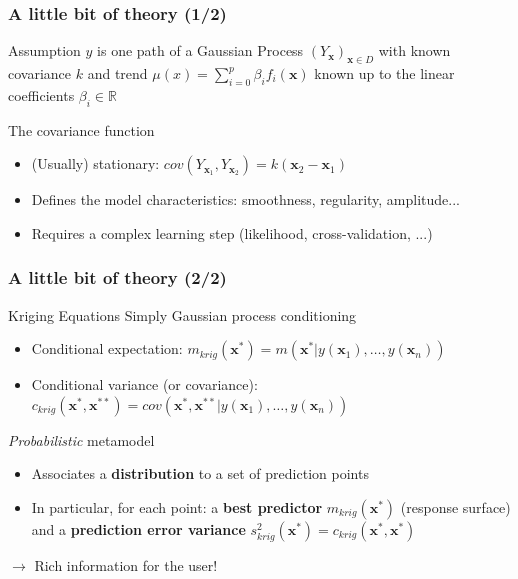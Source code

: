 \documentclass[10pt]{beamer}
\begin{document}
\frame
{
\frametitle{A little bit of theory (1/2)}
\begin{block}{Assumption}
$y$ is one path of a Gaussian Process $\left(Y_{\mathbf{x}}\right)_{\mathbf{x} \in D}$ with known covariance
$k$ and trend $\mu(x) =\sum_{i=0}^p \beta_i f_i(\mathbf{x})$ known up to the linear coefficients $\beta_i \in \mathbb{R}$
\end{block}

\begin{block}{The covariance function}
\begin{itemize}
 \item (Usually) stationary: $cov \left( Y_{\mathbf{x}_1}, Y_{\mathbf{x}_2} \right) = k(\mathbf{x}_2 - \mathbf{x}_1)$
 \item Defines the model characteristics: smoothness, regularity, amplitude...
 \item Requires a complex learning step (likelihood, cross-validation, ...)
\end{itemize}
\end{block}
}

\frame
{
\frametitle{A little bit of theory (2/2)}

\begin{block}{Kriging Equations}
Simply Gaussian process conditioning
\begin{itemize}
 \item Conditional expectation: $m_{krig}(\mathbf{x}^*) = m \left(\mathbf{x}^* | y(\mathbf{x}_1), \ldots, y(\mathbf{x}_n) \right)$
 \item Conditional variance (or covariance): $c_{krig}(\mathbf{x}^*,\mathbf{x}^{**}) = cov(\mathbf{x}^*, \mathbf{x}^{**}| y(\mathbf{x}_1), \ldots, y(\mathbf{x}_n) )$
\end{itemize}
\end{block}

\begin{block}{\textit{Probabilistic} metamodel}
\begin{itemize}
 \item Associates a \textbf{distribution} to a set of prediction points \\
 \item In particular, for each point: a \textbf{best predictor} $m_{krig}(\mathbf{x}^*)$ (response surface) and a \textbf{prediction error variance} $s_{krig}^2(\mathbf{x}^*) = c_{krig}(\mathbf{x}^*,\mathbf{x}^{*})$
\end{itemize}
$\rightarrow$ Rich information for the user!
\end{block}
}
\end{document}
